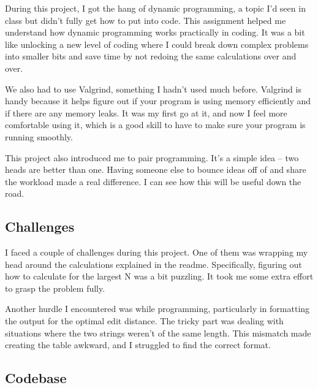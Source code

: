 During this project, I got the hang of dynamic programming, a topic I'd seen in class but didn't fully get how to put into code. This assignment helped me understand how dynamic programming works practically in coding. It was a bit like unlocking a new level of coding where I could break down complex problems into smaller bits and save time by not redoing the same calculations over and over.

We also had to use Valgrind, something I hadn't used much before. Valgrind is handy because it helps figure out if your program is using memory efficiently and if there are any memory leaks. It was my first go at it, and now I feel more comfortable using it, which is a good skill to have to make sure your program is running smoothly.

This project also introduced me to pair programming. It's a simple idea – two heads are better than one. Having someone else to bounce ideas off of and share the workload made a real difference. I can see how this will be useful down the road.

\subsection{Challenges}\label{sec:ps5:challenges}

I faced a couple of challenges during this project. One of them was wrapping my head around the calculations explained in the readme. Specifically, figuring out how to calculate for the largest N was a bit puzzling. It took me some extra effort to grasp the problem fully.

Another hurdle I encountered was while programming, particularly in formatting the output for the optimal edit distance. The tricky part was dealing with situations where the two strings weren't of the same length. This mismatch made creating the table awkward, and I struggled to find the correct format.

\subsection{Codebase}\label{sec:ps5:code}







\newpage
